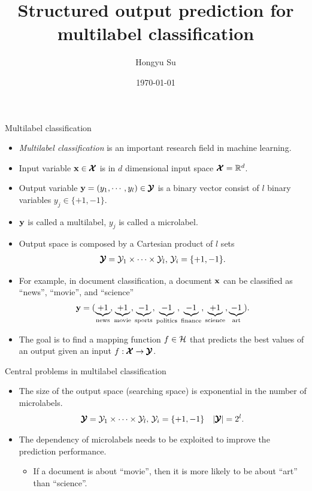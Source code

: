 \documentclass[first=dgreen,second=purple,logo=yellowexc]{aaltoslides}
\title{Structured output prediction for multilabel classification}
\author{Hongyu Su}
\institute[ICS]{
Helsinki Institute for Information Technology HIIT\\
Department of Computer Science, Aalto University
}
\date{ \today} %
\begin{document}
\aaltotitleframe
\footnotesize

%
\begin{frame}{Multilabel classification}
	\begin{itemize}\footnotesize
		\item {\em Multilabel classification} is an important research field in machine learning.
		\item Input variable $\mathbf {x}\in\pmb {\mathcal{X}}$ is in $d$ dimensional input space $\pmb {\mathcal{X}}=\mathbb{R}^d$.
		\item Output variable $\mathbf {y}=(y_1,\cdots,y_l)\in\pmb {\mathcal{Y}}$ is a binary vector consist of $l$ binary variables $y_j\in\{+1,-1\}$.
		\item $\mathbf {y}$ is called a multilabel, $y_j$ is called a microlabel.
		\item Output space is composed by a Cartesian product of $l$ sets
		\begin{align*}
			\pmb {\mathcal{Y}}=\mathcal{Y}_1\times\cdots\times\mathcal{Y}_l,\,\mathcal{Y}_i=\{+1,-1\}.
		\end{align*}
		\item For example, in document classification, a document $\mathbf {x}$ can be classified as ``news'', ``movie'', and ``science''
		\begin{align*}
\mathbf {y}=(\underbrace{+1}_{\text{news}},\underbrace{+1}_{\text{movie}},\underbrace{-1}_{\text{sports}},\underbrace{-1}_{\text{politics}},\underbrace{-1}_{\text{finance}},\underbrace{+1}_{\text{science}},\underbrace{-1}_{\text{art}}).
		\end{align*}\footnotesize
		\item The goal is to find a mapping function $f\in\mathcal{H}$ that predicts the best values of an output given an input $f:\pmb {\mathcal{X}}\rightarrow\pmb {\mathcal{Y}}$.
	\end{itemize}
\end{frame}

%
\begin{frame}{Central problems in multilabel classification}
	\begin{itemize}\footnotesize
		\item The size of the output space (searching space) is exponential in the number of microlabels.
		\begin{align*}
			\pmb {\mathcal{Y}}=\mathcal{Y}_1\times\cdots\times\mathcal{Y}_l,\,\mathcal{Y}_i=\{+1,-1\}\quad|\pmb {\mathcal{Y}}| = 2^l.
		\end{align*}
		\item The dependency of microlabels needs to be exploited to improve the prediction performance.
		\begin{itemize}\footnotesize
			\item If a document is about ``movie'', then it is more likely to be about ``art'' than ``science''.
		\end{itemize}
	\end{itemize}
\end{frame}
\end{document}
